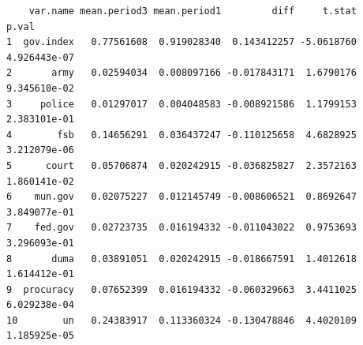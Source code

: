 \documentclass[
  letterpaper,
  DIV=11,
  numbers=noendperiod]{scrartcl}
\begin{document}
\begin{verbatim}
    var.name mean.period3 mean.period1         diff     t.stat        p.val
1  gov.index   0.77561608  0.919028340  0.143412257 -5.0618760 4.926443e-07
2       army   0.02594034  0.008097166 -0.017843171  1.6790176 9.345610e-02
3     police   0.01297017  0.004048583 -0.008921586  1.1799153 2.383101e-01
4        fsb   0.14656291  0.036437247 -0.110125658  4.6828925 3.212079e-06
5      court   0.05706874  0.020242915 -0.036825827  2.3572163 1.860141e-02
6    mun.gov   0.02075227  0.012145749 -0.008606521  0.8692647 3.849077e-01
7    fed.gov   0.02723735  0.016194332 -0.011043022  0.9753693 3.296093e-01
8       duma   0.03891051  0.020242915 -0.018667591  1.4012618 1.614412e-01
9  procuracy   0.07652399  0.016194332 -0.060329663  3.4411025 6.029238e-04
10        un   0.24383917  0.113360324 -0.130478846  4.4020109 1.185925e-05
\end{verbatim}
\end{document}
